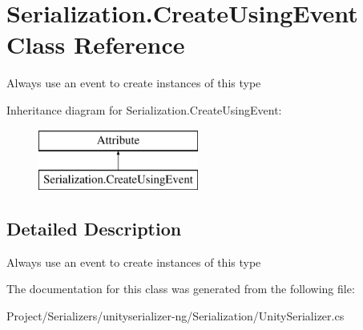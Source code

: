 \hypertarget{class_serialization_1_1_create_using_event}{}\section{Serialization.\+Create\+Using\+Event Class Reference}
\label{class_serialization_1_1_create_using_event}


Always use an event to create instances of this type  


Inheritance diagram for Serialization.\+Create\+Using\+Event\+:\begin{figure}[H]
\begin{center}
\leavevmode
\includegraphics[height=2.000000cm]{class_serialization_1_1_create_using_event}
\end{center}
\end{figure}


\subsection{Detailed Description}
Always use an event to create instances of this type 



The documentation for this class was generated from the following file\+:\begin{DoxyCompactItemize}
\item 
Project/\+Serializers/unityserializer-\/ng/\+Serialization/Unity\+Serializer.\+cs\end{DoxyCompactItemize}

